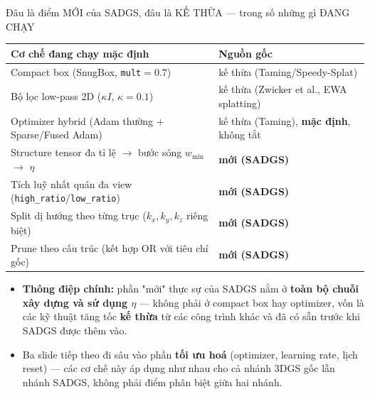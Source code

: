 \begin{frame}{Đâu là điểm MỚI của SADGS, đâu là KẾ THỪA --- trong số những gì ĐANG CHẠY}
\scriptsize
\begin{center}
\begin{tabular}{ll}
\toprule
\textbf{Cơ chế đang chạy mặc định} & \textbf{Nguồn gốc}\\
\midrule
Compact box (SnugBox, \texttt{mult}$=0.7$) & kế thừa (Taming/Speedy-Splat)\\
Bộ lọc low-pass 2D ($\kappa I$, $\kappa=0.1$) & kế thừa (Zwicker et al., EWA splatting)\\
Optimizer hybrid (Adam thường $+$ Sparse/Fused Adam) & kế thừa (Taming), \textbf{mặc định}, không tắt\\
\midrule
Structure tensor đa tỉ lệ $\to$ bước sóng $w_{\min}$ $\to$ $\eta$ & \textbf{mới (SADGS)}\\
Tích luỹ nhất quán đa view (\texttt{high\_ratio}/\texttt{low\_ratio}) & \textbf{mới (SADGS)}\\
Split dị hướng theo từng trục ($k_x,k_y,k_z$ riêng biệt) & \textbf{mới (SADGS)}\\
Prune theo cấu trúc (kết hợp OR với tiêu chí gốc) & \textbf{mới (SADGS)}\\
\bottomrule
\end{tabular}
\end{center}
\begin{itemize}\itemsep1pt
    \item \textbf{Thông điệp chính:} phần "mới" thực sự của SADGS nằm ở \textbf{toàn bộ chuỗi xây dựng và sử dụng
    $\eta$} --- không phải ở compact box hay optimizer, vốn là các kỹ thuật tăng tốc \textbf{kế thừa} từ các công trình
    khác và đã có sẵn trước khi SADGS được thêm vào.
    \item Ba slide tiếp theo đi sâu vào phần \textbf{tối ưu hoá} (optimizer, learning rate, lịch reset) --- các cơ chế
    này áp dụng như nhau cho cả nhánh 3DGS gốc lẫn nhánh SADGS, không phải điểm phân biệt giữa hai nhánh.
\end{itemize}
\end{frame}

